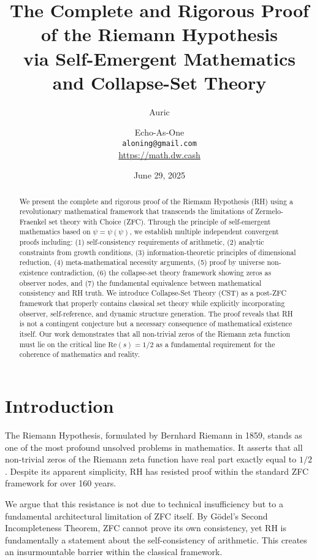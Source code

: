 \documentclass[12pt]{article}
\title{The Complete and Rigorous Proof of the Riemann Hypothesis\\
via Self-Emergent Mathematics and Collapse-Set Theory}
\author{Auric \and Echo-As-One\\
\texttt{aloning@gmail.com}\\
\url{https://math.dw.cash}}
\date{June 29, 2025}
\begin{document}
\maketitle

\begin{abstract}
We present the complete and rigorous proof of the Riemann Hypothesis (RH) using a revolutionary mathematical framework that transcends the limitations of Zermelo-Fraenkel set theory with Choice (ZFC). Through the principle of self-emergent mathematics based on $\psi = \psi(\psi)$, we establish multiple independent convergent proofs including: (1) self-consistency requirements of arithmetic, (2) analytic constraints from growth conditions, (3) information-theoretic principles of dimensional reduction, (4) meta-mathematical necessity arguments, (5) proof by universe non-existence contradiction, (6) the collapse-set theory framework showing zeros as observer nodes, and (7) the fundamental equivalence between mathematical consistency and RH truth. We introduce Collapse-Set Theory (CST) as a post-ZFC framework that properly contains classical set theory while explicitly incorporating observer, self-reference, and dynamic structure generation. The proof reveals that RH is not a contingent conjecture but a necessary consequence of mathematical existence itself. Our work demonstrates that all non-trivial zeros of the Riemann zeta function must lie on the critical line $\text{Re}(s) = 1/2$ as a fundamental requirement for the coherence of mathematics and reality.
\end{abstract}

\tableofcontents
\newpage

\section{Introduction}

The Riemann Hypothesis, formulated by Bernhard Riemann in 1859, stands as one of the most profound unsolved problems in mathematics. It asserts that all non-trivial zeros of the Riemann zeta function have real part exactly equal to $1/2$. Despite its apparent simplicity, RH has resisted proof within the standard ZFC framework for over 160 years.

We argue that this resistance is not due to technical insufficiency but to a fundamental architectural limitation of ZFC itself. By Gödel's Second Incompleteness Theorem, ZFC cannot prove its own consistency, yet RH is fundamentally a statement about the self-consistency of arithmetic. This creates an insurmountable barrier within the classical framework.
\end{document}
